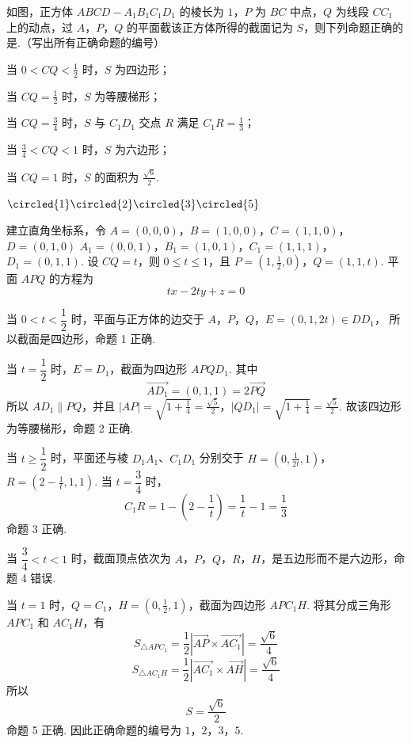 \begin{problem}
如图，正方体 \(ABCD - A_{1}B_{1}C_{1}D_{1}\) 的棱长为 \(1\)，\(P\) 为 \(BC\) 中点，\(Q\) 为线段 \(CC_{1}\) 上的动点，过 \(A\)，\(P\)，\(Q\) 的平面截该正方体所得的截面记为 \(S\)，则下列命题正确的是\fillinblank{}.（写出所有正确命题的编号）

\begin{circlelist}
\item 当 \(0 < CQ < \frac{1}{2}\) 时，\(S\) 为四边形；
    \item 当 \(CQ = \frac{1}{2}\) 时，\(S\) 为等腰梯形；
\item 当 \(CQ = \frac{3}{4}\) 时，\(S\) 与 \(C_{1}D_{1}\) 交点 \(R\) 满足 \(C_{1}R = \frac{1}{3}\)；
    \item 当 \(\frac{3}{4} < CQ < 1\) 时，\(S\) 为六边形；
\item 当 \(CQ = 1\) 时，\(S\) 的面积为 \(\frac{\sqrt{6}}{2}\).
\end{circlelist}

\end{problem}

\begin{answer}
\(\circled{1}\circled{2}\circled{3}\circled{5}\)
\end{answer}

\begin{solution}
建立直角坐标系，令
\(A=(0,0,0)\)，\(B=(1,0,0)\)，\(C=(1,1,0)\)，\(D=(0,1,0)\)
\(A_1=(0,0,1)\)，\(B_1=(1,0,1)\)，\(C_1=(1,1,1)\)，\(D_1=(0,1,1)\).
设 \(CQ=t\)，则 \(0\leqslant t\leqslant1\)，且
\(P=\left(1,\frac12,0\right)\)，\(Q=(1,1,t)\).
平面 \(APQ\) 的方程为
\[
t x-2t y+z=0
\]

当 \(0<t<\dfrac12\) 时，平面与正方体的边交于
\(A\)，\(P\)，\(Q\)，\(E=(0,1,2t)\in DD_1\)，
所以截面是四边形，命题 1 正确.

当 \(t=\dfrac12\) 时，\(E=D_1\)，截面为四边形 \(APQD_1\). 其中
\[
\overrightarrow{AD_1}=(0,1,1)=2\overrightarrow{PQ}
\]
所以 \(AD_1\parallel PQ\)，并且
\(|AP|=\sqrt{1+\frac14}=\frac{\sqrt5}{2}\)，\(|QD_1|=\sqrt{1+\frac14}=\frac{\sqrt5}{2}\).
故该四边形为等腰梯形，命题 2 正确.

当 \(t\geqslant\dfrac12\) 时，平面还与棱 \(D_1A_1\)、\(C_1D_1\) 分别交于
\(H=\left(0,\frac{1}{2t},1\right)\)，\(R=\left(2-\frac1t,1,1\right)\).
当 \(t=\dfrac34\) 时，
\[
C_1R=1-\left(2-\frac{1}{t}\right)=\frac1t-1=\frac13
\]
命题 3 正确.

当 \(\dfrac34<t<1\) 时，截面顶点依次为 \(A\)，\(P\)，\(Q\)，\(R\)，\(H\)，是五边形而不是六边形，命题 4 错误.

当 \(t=1\) 时，\(Q=C_1\)，\(H=(0,\frac12,1)\)，截面为四边形 \(APC_1H\). 将其分成三角形 \(APC_1\) 和 \(AC_1H\)，有
\[
S_{\triangle APC_1}=\frac12\left|\overrightarrow{AP}\times\overrightarrow{AC_1}\right|=\frac{\sqrt6}{4}
\]
\[
S_{\triangle AC_1H}=\frac12\left|\overrightarrow{AC_1}\times\overrightarrow{AH}\right|=\frac{\sqrt6}{4}
\]
所以
\[
S=\frac{\sqrt6}{2}
\]
命题 5 正确. 因此正确命题的编号为 \(1\)，\(2\)，\(3\)，\(5\).
\end{solution}

